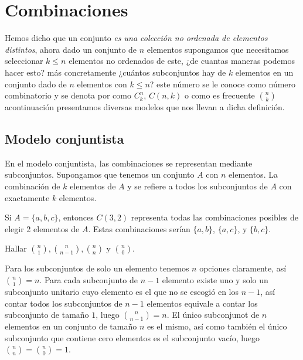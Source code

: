 \section{Combinaciones}

Hemos dicho que un conjunto \textit{es una colección no ordenada de elementos distintos}, ahora dado un conjunto de $n$ elementos supongamos que necesitamos seleccionar $k\leq n$ elementos no ordenados de este, ¿de cuantas maneras podemos hacer esto? más concretamente ¿cuántos subconjuntos hay de $k$ elementos en un conjunto dado de $n$ elementos con $k\leq n$? este número se le conoce como número combinatorio y se denota por como $\displaystyle C_k^n$, \( C(n, k) \)  o como es frecuente $\displaystyle {n \choose k}$ acontinuación presentamos diversas modelos que nos llevan a dicha definición.

\subsection{Modelo conjuntista}

\begin{definicion}
 En el modelo conjuntista, las combinaciones se representan mediante subconjuntos. Supongamos que tenemos un conjunto \( A \) con \( n \) elementos. La combinación de \( k \) elementos de \( A \) y se refiere a todos los subconjuntos de \( A \) con exactamente \( k \) elementos.   
\end{definicion}

\begin{ejemplo}
Si \( A = \{a, b, c\} \), entonces \( C(3, 2) \) representa todas las combinaciones posibles de elegir 2 elementos de \( A \). Estas combinaciones serían \(\{a, b\}\), \(\{a, c\}\), y \(\{b, c\}\).
\end{ejemplo}

\begin{ejemplo}
Hallar $\displaystyle\binom{n}{1}, \displaystyle\binom{n}{n-1}, \binom{n}{n}$ y $\displaystyle\binom{n}{0}$. 
\end{ejemplo}

\begin{solucion}
Para los subconjuntos de solo un elemento tenemos $n$ opciones claramente, así $\displaystyle\binom{n}{1}=n$. Para cada subconjunto de $n-1$ elemento existe uno y solo un subconjunto unitario cuyo elemento es el que no se escogió en los $n-1$, así contar todos los subconjuntos de $n-1$ elementos equivale a contar los subconjunto de tamaño $1$, luego $\displaystyle\binom{n}{n-1}=n$. El único subconjunot de $n$ elementos en un conjunto de tamaño $n$ es el mismo, así como también el único subconjunto que contiene cero elementos es el subconjunto vacío, luego $\displaystyle\binom{n}{n}=\displaystyle\binom{n}{0}=1$.     
\end{solucion}

